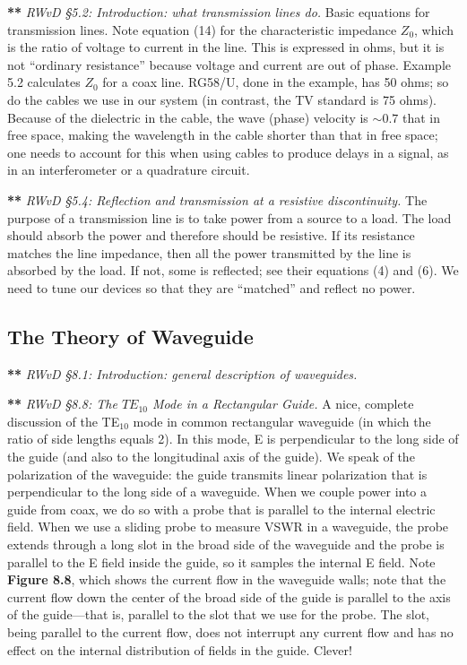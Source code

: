 \documentclass[11pt,preprint]{aastex}
\begin{document}
{\bf ***} {\it RWvD \S 5.2:  Introduction: what transmission lines do.}
Basic equations for transmission lines.  Note
equation (14) for the characteristic impedance $Z_0$, which is the ratio
of voltage to current in the line.  This is expressed in ohms, but it is
not ``ordinary resistance'' because voltage and current are out of
phase.  Example 5.2 calculates $Z_0$ for a coax line.  RG58/U, done in
the example, has 50 ohms; so do the cables we use in our system (in
contrast, the TV standard is 75 ohms).  Because of the dielectric in the
cable, the wave (phase) velocity is $\sim 0.7$ that in free space,
making the wavelength in the cable shorter than that in free space; one
needs to account for this when using cables to produce delays in a
signal, as in an interferometer or a quadrature circuit. 

{\bf ***} {\it RWvD \S 5.4: Reflection and transmission at a resistive
discontinuity.} The purpose of a transmission line is to take power from
a source to a load. The load should absorb the power and therefore
should be resistive. If its resistance matches the line impedance, then
all the power transmitted by the line is absorbed by the load. If not,
some is reflected; see their equations (4) and (6). We need to tune our
devices so that they are ``matched'' and reflect no power. 

\subsection{The Theory of Waveguide}
          
{\bf ***} {\it RWvD \S 8.1:  Introduction: general description of
waveguides.} 

{\bf ***} {\it RWvD \S 8.8:  The $TE_{10}$ Mode in a Rectangular
Guide.} A nice, complete discussion of the TE$_{10}$ mode in common
rectangular waveguide (in which the ratio of side lengths equals 2). 
In this mode, E is perpendicular to the long side of the guide
(and also to the longitudinal axis of the guide).  We speak of the
polarization of the waveguide: the guide transmits linear polarization
that is perpendicular to the long side of a waveguide.  When we couple
power into a guide from coax, we do so with a probe that is parallel to
the internal electric field.  When we use a sliding probe to measure
VSWR in a waveguide, the probe extends through a long slot in the broad
side of the waveguide and the probe is parallel to the E field inside
the guide, so it samples the internal E field.  Note {\bf Figure 8.8},
which shows the current flow in the waveguide walls; note that the
current flow down the center of the broad side of the guide is parallel
to the axis of the guide---that is, parallel to the slot that we use for
the probe.  The slot, being parallel to the current flow, does not
interrupt any current flow and has no effect on the internal
distribution of fields in the guide.  Clever!
\end{document}

